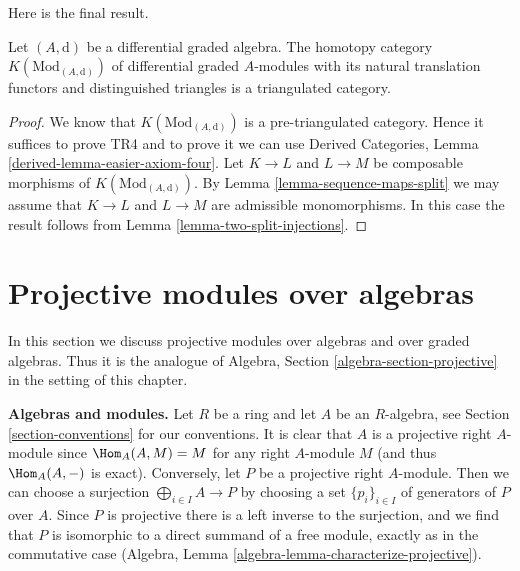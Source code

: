 \noindent
Here is the final result.

\begin{proposition}
\label{proposition-homotopy-category-triangulated}
Let $(A, \text{d})$ be a differential graded algebra. The homotopy category
$K(\text{Mod}_{(A, \text{d})})$ of differential graded $A$-modules with its
natural translation functors and distinguished triangles is a triangulated
category.
\end{proposition}

\begin{proof}
We know that $K(\text{Mod}_{(A, \text{d})})$ is a pre-triangulated category.
Hence it suffices to prove TR4 and to prove it we can use
Derived Categories, Lemma \ref{derived-lemma-easier-axiom-four}.
Let $K \to L$ and $L \to M$ be composable morphisms of
$K(\text{Mod}_{(A, \text{d})})$. By
Lemma \ref{lemma-sequence-maps-split} we may assume that
$K \to L$ and $L \to M$ are admissible monomorphisms.
In this case the result follows from
Lemma \ref{lemma-two-split-injections}.
\end{proof}













\section{Projective modules over algebras}
\label{section-projectives-over-algebras}

\noindent
In this section we discuss projective modules over algebras
and over graded algebras. Thus it is the analogue of
Algebra, Section \ref{algebra-section-projective}
in the setting of this chapter.

\medskip\noindent
{\bf Algebras and modules.} Let $R$ be a ring and let $A$ be an
$R$-algebra, see Section \ref{section-conventions} for our conventions.
It is clear that $A$ is a projective right $A$-module since
$\Hom_A(A, M) = M$ for any right $A$-module $M$ (and thus $\Hom_A(A, -)$
is exact). Conversely, let $P$ be a projective right $A$-module. Then
we can choose a surjection
$\bigoplus_{i \in I} A \to P$ by choosing a set $\{p_i\}_{i \in I}$
of generators of $P$ over $A$. Since $P$ is projective there is a
left inverse to the surjection, and we find that $P$ is isomorphic
to a direct summand of a free module, exactly as in the commutative case
(Algebra, Lemma \ref{algebra-lemma-characterize-projective}).

